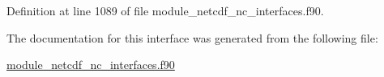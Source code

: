 Definition at line 1089 of file module\+\_\+netcdf\+\_\+nc\+\_\+interfaces.\+f90.



The documentation for this interface was generated from the following file\+:\begin{DoxyCompactItemize}
\item 
\hyperlink{module__netcdf__nc__interfaces_8f90}{module\+\_\+netcdf\+\_\+nc\+\_\+interfaces.\+f90}\end{DoxyCompactItemize}
